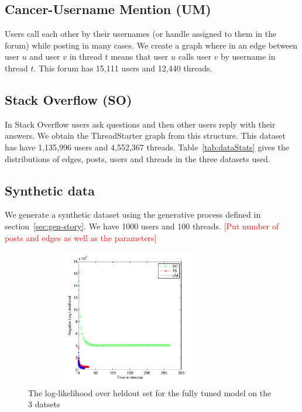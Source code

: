 \documentclass{sig-alternate}
\newcommand{\comment}[1]{\textcolor{red}{[#1]}}
\begin{document}
\subsection{Cancer-Username Mention (UM)}
Users call each other by their usernames (or handle assigned to them in the
forum) while posting in many cases. We create a graph where in an edge between
user $u$ and user $v$ in thread $t$ means that user $u$ calls user $v$ by
username in thread $t$. This forum has 15,111 users and
12,440 threads.

\subsection{Stack Overflow (SO)}
In Stack Overflow users ask questions and then other users reply with their
answers. We obtain the ThreadStarter graph from this structure. This dataset has
have 1,135,996 users and 4,552,367 threads.
Table~\ref{tab:dataStats} gives the distributions of edges, posts, users and
threads in the three datasets used. 
\subsection{Synthetic data}
We generate a synthetic dataset using the generative process defined in
section~\ref{sec:gen-story}. We have 1000 users and 100 threads. 
\comment{Put number of posts and edges as well as the parameters}
\\
 
\begin{figure}
\begin{center}
\includegraphics[height=6cm,width=9cm]{3LLPlots.pdf}
\end{center}
\caption{The log-likelihood over heldout set for the fully tuned model on the
3 datsets}
\label{fig:finalLLheld}
\end{figure}
 
\end{document}
